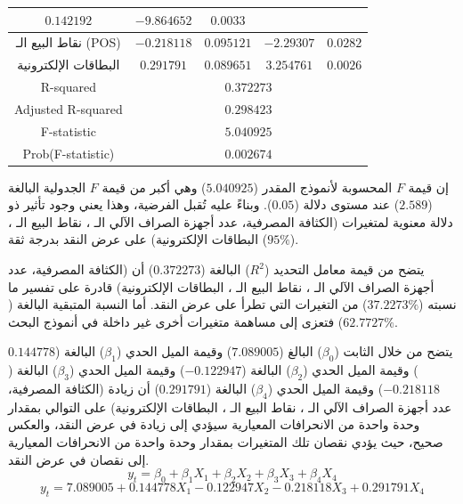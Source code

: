 \documentclass[10pt,a4paper]{report}
\begin{document}
\begin{doublespacing}
\begin{table}[H]
{\begin{tabular}{|ccccc|}
				\multicolumn{1}{c|}{$0.142192$} &
				\multicolumn{1}{c|}{$-9.864652$} &
				$0.0033$ \\ \hline
				\multicolumn{1}{|c|}{نقاط   البيع الـ (POS)}             & \multicolumn{1}{c|}{$-0.218118$} & \multicolumn{1}{c|}{$0.095121$} & \multicolumn{1}{c|}{$-2.29307$} & $0.0282$ \\ \hline
				\multicolumn{1}{|c|}{البطاقات   الإلكترونية}             & \multicolumn{1}{c|}{$0.291791$}  & \multicolumn{1}{c|}{$0.089651$} & \multicolumn{1}{c|}{$3.254761$} & $0.0026$ \\ \hline
				\multicolumn{1}{|c|}{\textenglish{R-squared}}            & \multicolumn{4}{c|}{$0.372273$}                                                                                 \\ \hline
				\multicolumn{1}{|c|}{\textenglish{Adjusted   R-squared}} & \multicolumn{4}{c|}{$0.298423$}                                                                                 \\ \hline
				\multicolumn{1}{|c|}{\textenglish{F-statistic}}          & \multicolumn{4}{c|}{$5.040925$}                                                                                 \\ \hline
				\multicolumn{1}{|c|}{\textenglish{Prob(F-statistic)}}    & \multicolumn{4}{c|}{$0.002674$}                                                                                 \\ \hline
			\end{tabular}%
		}
	\end{table}
إن قيمة \(F\) المحسوبة لأنموذج المقدر ($5.040925$) وهي أكبر من قيمة \(F\) الجدولية البالغة ($2.589$) عند مستوى دلالة ($0.05$). وبناءً عليه تُقبل الفرضية، وهذا يعني وجود تأثير ذو دلالة معنوية لمتغيرات ({الكثافة المصرفية، عدد أجهزة الصراف الآلي الـ ، نقاط البيع الـ ، البطاقات الإلكترونية}) على عرض النقد بدرجة ثقة ($95\%$).

يتضح من قيمة معامل التحديد (\(R^2\)) البالغة ($0.372273$) أن ({الكثافة المصرفية، عدد أجهزة الصراف الآلي الـ ، نقاط البيع الـ ، البطاقات الإلكترونية}) قادرة على تفسير ما نسبته ($37.2273\%$) من التغيرات التي تطرأ على عرض النقد. أما النسبة المتبقية البالغة ($62.7727\%$) فتعزى إلى مساهمة متغيرات أخرى غير داخلة في أنموذج البحث.

يتضح من خلال الثابت (\(\beta_0\)) البالغ ($7.089005$) وقيمة الميل الحدي (\(\beta_1\)) البالغة ($0.144778$) وقيمة الميل الحدي (\(\beta_2\)) البالغة ($-0.122947$) وقيمة الميل الحدي (\(\beta_3\)) البالغة ($-0.218118$) وقيمة الميل الحدي (\(\beta_4\)) البالغة ($0.291791$) أن زيادة ({الكثافة المصرفية، عدد أجهزة الصراف الآلي الـ ، نقاط البيع الـ ، البطاقات الإلكترونية}) على التوالي بمقدار وحدة واحدة من الانحرافات المعيارية سيؤدي إلى زيادة في عرض النقد، والعكس صحيح، حيث يؤدي نقصان تلك المتغيرات بمقدار وحدة واحدة من الانحرافات المعيارية إلى نقصان في عرض النقد.
\begin{equation}
	y_t=\beta_0+\beta_1X_1+\beta_2X_2+\beta_3X_3+\beta_4X_4
\end{equation}
\[
y_t = 7.089005 + 0.144778 X_1 - 0.122947 X_2 - 0.218118 X_3 + 0.291791 X_4
\]


\end{doublespacing}
\end{document}
